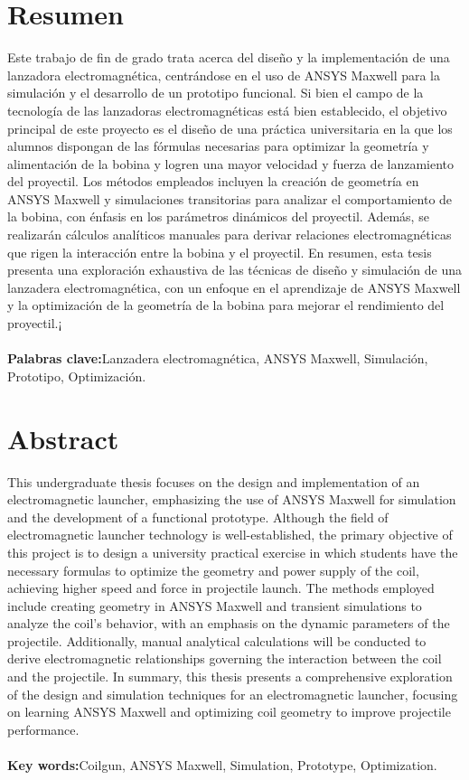 \section*{Resumen}

Este trabajo de fin de grado trata acerca del diseño y la implementación de una lanzadora electromagnética, centrándose en el uso de ANSYS Maxwell para la simulación y el desarrollo de un prototipo funcional. Si bien el campo de la tecnología de las lanzadoras electromagnéticas está bien establecido, el objetivo principal de este proyecto es el diseño de una práctica universitaria en la que los alumnos dispongan de las fórmulas necesarias para optimizar la geometría y alimentación de la bobina y logren una mayor velocidad y fuerza de lanzamiento del proyectil. Los métodos empleados incluyen la creación de geometría en ANSYS Maxwell y simulaciones transitorias para analizar el comportamiento de la bobina, con énfasis en los parámetros dinámicos del proyectil. Además, se realizarán cálculos analíticos manuales para derivar relaciones electromagnéticas que rigen la interacción entre la bobina y el proyectil. En resumen, esta tesis presenta una exploración exhaustiva de las técnicas de diseño y simulación de una lanzadera electromagnética, con un enfoque en el aprendizaje de ANSYS Maxwell y la optimización de la geometría de la bobina para mejorar el rendimiento del proyectil.¡
\\~\\
\textbf{Palabras clave:}Lanzadera electromagnética, ANSYS Maxwell, Simulación, Prototipo, Optimización.

\newpage
\thispagestyle{plain}
\section*{Abstract}
This undergraduate thesis focuses on the design and implementation of an electromagnetic launcher, emphasizing the use of ANSYS Maxwell for simulation and the development of a functional prototype. Although the field of electromagnetic launcher technology is well-established, the primary objective of this project is to design a university practical exercise in which students have the necessary formulas to optimize the geometry and power supply of the coil, achieving higher speed and force in projectile launch. The methods employed include creating geometry in ANSYS Maxwell and transient simulations to analyze the coil's behavior, with an emphasis on the dynamic parameters of the projectile. Additionally, manual analytical calculations will be conducted to derive electromagnetic relationships governing the interaction between the coil and the projectile. In summary, this thesis presents a comprehensive exploration of the design and simulation techniques for an electromagnetic launcher, focusing on learning ANSYS Maxwell and optimizing coil geometry to improve projectile performance.
\\~\\
\textbf{Key words:}Coilgun, ANSYS Maxwell, Simulation, Prototype, Optimization.